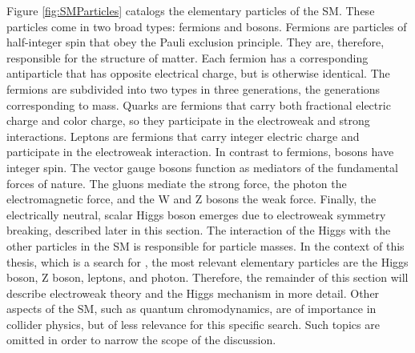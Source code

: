 Figure \ref{fig:SMParticles} catalogs the elementary particles of the SM. These particles come in two broad types: fermions and bosons. Fermions are particles of half-integer spin that obey 
the Pauli exclusion principle. They are, therefore, responsible for the structure of matter. 
Each fermion has a corresponding antiparticle that has opposite electrical charge, but is otherwise identical. 
The fermions are subdivided into two types in three generations, the generations corresponding to mass.
Quarks are fermions that carry both fractional electric charge and color charge, so they participate in the electroweak and strong interactions. 
Leptons are fermions that carry integer electric charge and participate in the electroweak interaction.
In contrast to fermions, bosons have integer spin. The vector gauge bosons function as mediators of the fundamental forces of nature. 
The gluons mediate the strong force, the photon the electromagnetic force, and the W and Z bosons the weak force. 
Finally, the electrically neutral, scalar Higgs boson emerges due to electroweak symmetry breaking, described later in this section. The interaction of the Higgs 
with the other particles in the SM is responsible for particle masses. 
In the context of this thesis, which is a search for \hzg{}, the most relevant elementary particles are the Higgs boson, Z boson, leptons, and photon. 
Therefore, the remainder of this section will describe electroweak theory and the Higgs mechanism in more detail. Other aspects of the SM, such as quantum chromodynamics, 
are of importance in collider physics, but of less relevance for this specific search. Such topics are omitted in order to narrow the scope of the discussion.

